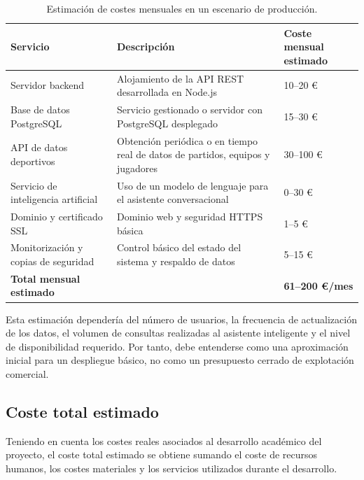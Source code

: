 \begin{table}[H]
\centering
\caption{Estimación de costes mensuales en un escenario de producción.}
\label{tab:costes_produccion}
\renewcommand{\arraystretch}{1.2}
\begin{tabular}{|p{6cm}|p{6cm}|p{3cm}|}
\hline
\textbf{Servicio} & \textbf{Descripción} & \textbf{Coste mensual estimado} \\ \hline

Servidor backend &
Alojamiento de la API REST desarrollada en Node.js &
10--20 \euro \\ \hline

Base de datos PostgreSQL &
Servicio gestionado o servidor con PostgreSQL desplegado &
15--30 \euro \\ \hline

API de datos deportivos &
Obtención periódica o en tiempo real de datos de partidos, equipos y jugadores &
30--100 \euro \\ \hline

Servicio de inteligencia artificial &
Uso de un modelo de lenguaje para el asistente conversacional &
0--30 \euro \\ \hline

Dominio y certificado SSL &
Dominio web y seguridad HTTPS básica &
1--5 \euro \\ \hline

Monitorización y copias de seguridad &
Control básico del estado del sistema y respaldo de datos &
5--15 \euro \\ \hline

\textbf{Total mensual estimado} &
&
\textbf{61--200 \euro/mes} \\ \hline

\end{tabular}
\end{table}

Esta estimación dependería del número de usuarios, la frecuencia de actualización de los datos, el volumen de consultas realizadas al asistente inteligente y el nivel de disponibilidad requerido. Por tanto, debe entenderse como una aproximación inicial para un despliegue básico, no como un presupuesto cerrado de explotación comercial.

\subsection{Coste total estimado}

Teniendo en cuenta los costes reales asociados al desarrollo académico del proyecto, el coste total estimado se obtiene sumando el coste de recursos humanos, los costes materiales y los servicios utilizados durante el desarrollo.

